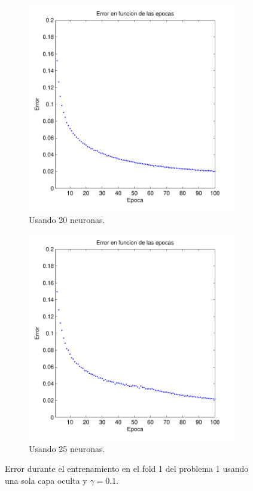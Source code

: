 \documentclass[informe.tex]{subfiles}
\begin{document}
\begin{figure}[H]
\begin{subfigure}[b]{0.32\textwidth}
                \includegraphics[width=\textwidth]{graficos/error_fold1_20_binary_100_01.pdf}
                \caption{Usando 20 neuronas.}
                \label{fig:d1-f1-01-n20}
        \end{subfigure}
        \begin{subfigure}[b]{0.32\textwidth}
                \includegraphics[width=\textwidth]{graficos/error_fold1_25_binary_100_01.pdf}
                \caption{Usando 25 neuronas.}
                \label{fig:d1-f1-01-n25}
        \end{subfigure}
        
        \caption{Error durante el entrenamiento en el fold 1 del problema 1 usando una sola capa oculta y $\gamma=0.1$.}\label{fig:p1-f1-gamma01}
    \end{figure}
    
\end{document}
